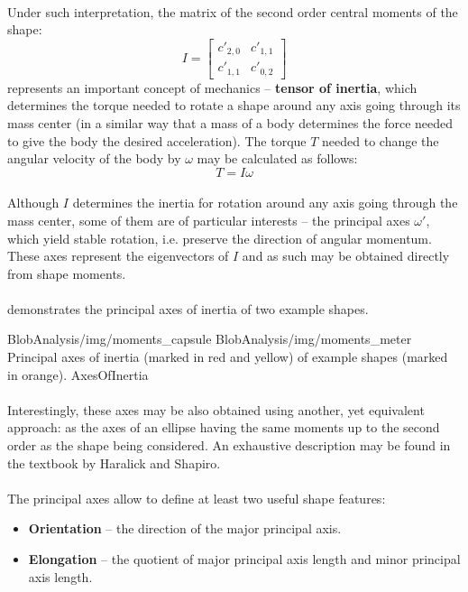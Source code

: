 \paragraph*{}
Under such interpretation, the matrix of the second order central moments of the shape:
\[
I = \begin{bmatrix}
c'_{2,0} & c'_{1,1}\\
c'_{1,1} & c'_{0,2}
\end{bmatrix}
\]
represents an important concept of mechanics -- \textbf{tensor of inertia}, which determines the torque needed to rotate a shape around any axis going through its mass center (in a similar way that a mass of a body determines the force needed to give the body the desired acceleration). The torque $T$ needed to change the angular velocity of the body by $\omega$ may be calculated as follows:
\[
	T = I\omega
\]

\paragraph*{}
Although $I$ determines the inertia for rotation around any axis going through the mass center, some of them are of particular interests -- the principal axes $\omega'$, which yield stable rotation, i.e. preserve the direction of angular momentum. These axes represent the eigenvectors of $I$ and as such may be obtained directly from shape moments.

\paragraph*{}
 demonstrates the principal axes of inertia of two example shapes.

\twoFigures
{BlobAnalysis/img/moments_capsule}
{BlobAnalysis/img/moments_meter}
{Principal axes of inertia (marked in red and yellow) of example shapes (marked in orange).}
{AxesOfInertia}
{\basicWidth}

\paragraph*{}
Interestingly, these axes may be also obtained using another, yet equivalent approach: as the axes of an ellipse having the same moments up to the second order as the shape being considered. An exhaustive description may be found in the textbook\cite[p.~73-75]{Haralick92} by Haralick and Shapiro.

\paragraph*{}
The principal axes allow to define at least two useful shape features:
\begin{itemize}
	\item \textbf{Orientation} -- the direction of the major principal axis.
	\item \textbf{Elongation} -- the quotient of major principal axis length and minor principal axis length.
\end{itemize}  


